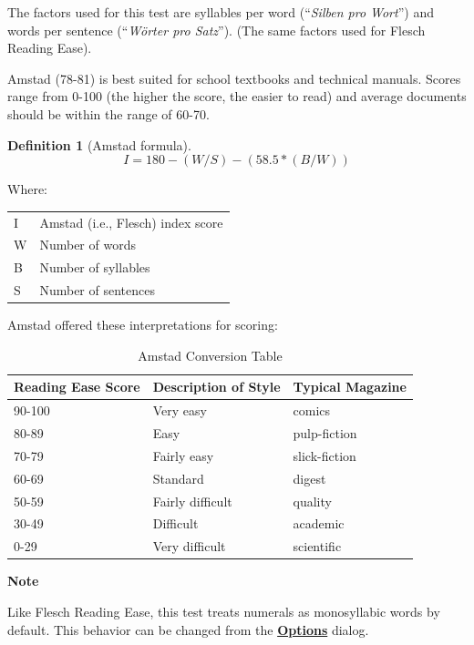 \documentclass[
]{book}
\newenvironment{notesection}
    {
    \begin{tcolorbox}[colframe=mediumblue,colback=lightblue,coltext=mediumblue,arc=3mm]
    \faLightbulb[regular] \textbf{Note} \newline
    }
    {
    \end{tcolorbox}
    }
\theoremstyle{definition}
\newtheorem{definition}{Definition}[chapter]
\theoremstyle{definition}
\theoremstyle{definition}
\theoremstyle{definition}
\theoremstyle{remark}
\begin{document}
The factors used for this test are syllables per word (``\emph{Silben pro Wort}'') and words per sentence (``\emph{Wörter pro Satz}''). (The same factors used for Flesch Reading Ease).

Amstad (78-81) is best suited for school textbooks and technical manuals. Scores range from 0-100 (the higher the score, the easier to read) and average documents should be within the range of 60-70.

\begin{definition}[Amstad formula]
\protect\hypertarget{def:amstad}{}{\label{def:amstad} {} }\[I = 180 - (W/S) - (58.5*(B/W))\]
\end{definition}

Where:

\begin{longtable}[]{@{}
  >{\raggedright\arraybackslash}p{}
  >{\raggedright\arraybackslash}p{}@{}}
\toprule
\endhead
I & Amstad (i.e., Flesch) index score \\
W & Number of words \\
B & Number of syllables \\
S & Number of sentences \\
\bottomrule
\end{longtable}

Amstad offered these interpretations for scoring:

\begin{table}

\caption{\label{tab:unnamed-chunk-20}Amstad Conversion Table}
\centering
\begin{tabular}[t]{lll}
\toprule
Reading Ease Score & Description of Style & Typical Magazine\\
\midrule
90-100 & Very easy & comics\\
80-89 & Easy & pulp-fiction\\
70-79 & Fairly easy & slick-fiction\\
60-69 & Standard & digest\\
50-59 & Fairly difficult & quality\\
30-49 & Difficult & academic\\
0-29 & Very difficult & scientific\\
\bottomrule
\end{tabular}
\end{table}

\begin{notesection}
Like Flesch Reading Ease, this test treats numerals as monosyllabic words by default. This behavior can be changed from the \protect\hyperlink{readability-test-options}{\textbf{Options}} dialog.

\end{notesection}
\end{document}
